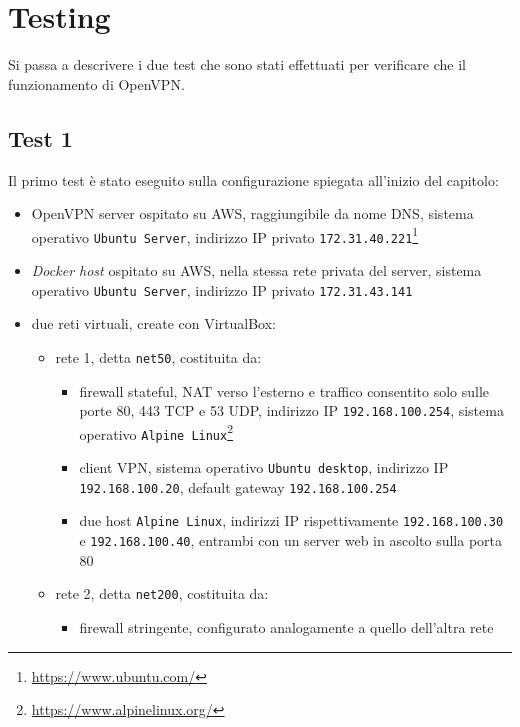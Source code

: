 \section{Testing}
Si passa a descrivere
i due test che sono stati effettuati per verificare che il funzionamento di OpenVPN.

\subsection{Test 1}
Il primo test è stato eseguito sulla configurazione spiegata all'inizio del capitolo:
\begin{itemize}
	\item OpenVPN server ospitato su AWS, raggiungibile da nome DNS, sistema
	      operativo \texttt{Ubuntu Server}, indirizzo IP privato \texttt{172.31.40.221}\footnote{\url{https://www.ubuntu.com/}}
	\item \textit{Docker host} ospitato su AWS, nella stessa rete privata del
	      server, sistema
	      operativo \texttt{Ubuntu Server}, indirizzo IP privato \texttt{172.31.43.141}
	\item due reti virtuali, create con VirtualBox:
	      \begin{itemize}
	      	\item rete 1, detta \texttt{net50}, costituita da:
	      	      \begin{itemize}
	      	      	\item firewall stateful, NAT verso l'esterno e traffico consentito solo
	      	      	      sulle porte 80, 443 TCP e 53 UDP, indirizzo IP \texttt{192.168.100.254},
	      	      	      sistema operativo \texttt{Alpine Linux}\footnote{\url{https://www.alpinelinux.org/}}
	      	      	\item client VPN, sistema operativo \texttt{Ubuntu desktop}, indirizzo
	      	      	      IP \texttt{192.168.100.20}, default gateway \texttt{192.168.100.254}
	      	      	\item due host \texttt{Alpine Linux}, indirizzi IP rispettivamente
	      	      	      \texttt{192.168.100.30} e \texttt{192.168.100.40}, entrambi con un server
	      	      	      web in ascolto sulla porta 80
	      	      \end{itemize}
	      	\item rete 2, detta \texttt{net200}, costituita da:
	      	      \begin{itemize}
	      	      	\item firewall stringente, configurato analogamente a quello dell'altra rete

\end{itemize}
\end{itemize}
\end{itemize}
